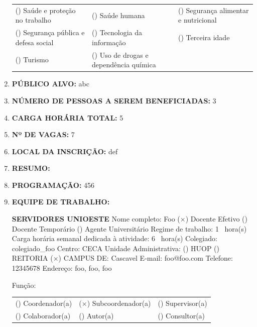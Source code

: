 \documentclass[12pt,a4paper,oneside]{article}%
\begin{document}
\begin{enumerate}
{\begin{tabularx}{\linewidth}{X|X|X}
() Saúde e proteção no trabalho&() Saúde humana&() Segurança alimentar e nutricional\\%
() Segurança pública e defesa social&() Tecnologia da informação&() Terceira idade\\%
() Turismo&() Uso de drogas e dependência química&\\%
\end{tabularx}%
}%
\item%
\textbf{PÚBLICO ALVO: }%
abc%
\item%
\textbf{NÚMERO DE PESSOAS A SEREM BENEFICIADAS: }%
3%
\item%
\textbf{CARGA HORÁRIA TOTAL: }%
5%
\item%
\textbf{Nº DE VAGAS: }%
7%
\item%
\textbf{LOCAL DA INSCRIÇÃO: }%
def%
\item%
\textbf{RESUMO: }%
%
\item%
\textbf{PROGRAMAÇÃO: }%
456%
\item%
\textbf{EQUIPE DE TRABALHO: }%
\newline%
\begin{mdframed}[innertopmargin=5pt, innerleftmargin=3pt, innerrightmargin=3pt]%
\textbf{SERVIDORES UNIOESTE }%
\newline%
Nome completo: %
Foo%
\newline%
 ($\times$) Docente Efetivo %
 () Docente Temporário %
 () Agente Universitário %
\newline%
Regime de trabalho: %
1%
\ hora(s) \hfill%
Carga horária semanal dedicada à atividade: %
6%
\ hora(s) \hfill%
\newline%
Colegiado: %
colegiado\_foo%
\hfill%
Centro: %
CECA%
\newline%
Unidade Administrativa: %
() HUOP %
() REITORIA %
($\times$) CAMPUS DE: %
Cascavel%
\newline%
E-mail: %
foo@foo.com%
\newline%
Telefone: %
12345678%
\newline%
Endereço: %
foo, foo, foo%
\newline%
\begin{mdframed}[innertopmargin=5pt, innerleftmargin=3pt, innerrightmargin=3pt]%
Função: %
\newline%
\begin{tabularx}{\linewidth}{XXX}%
() Coordenador(a)&($\times$) Subcoordenador(a)&() Supervisor(a)\\%
() Colaborador(a)&() Autor(a)&() Consultor(a)\\%

\end{tabularx}
\end{mdframed}
\end{mdframed}
\end{enumerate}
\end{document}
